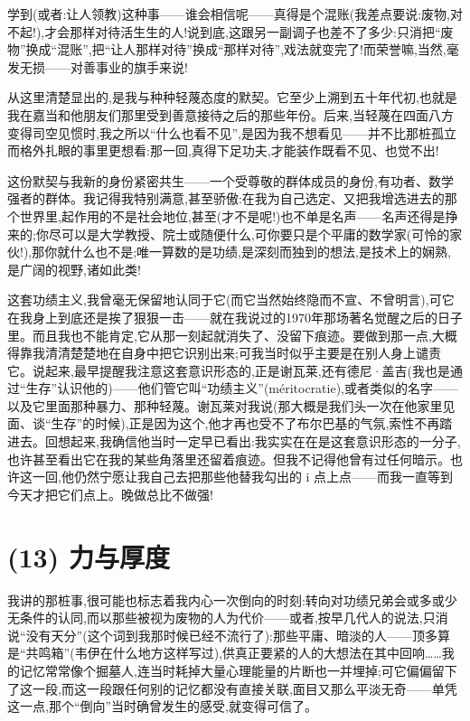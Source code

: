 学到(或者:让人领教)这种事——谁会相信呢——真得是个混账(我差点要说:废物,对不起!),才会那样对待活生生的人!说到底,这跟另一副调子也差不了多少:只消把“废物”换成“混账”,把“让人那样对待”换成“那样对待”,戏法就变完了!而荣誉嘛,当然,毫发无损——对善事业的旗手来说!

 从这里清楚显出的,是我与种种轻蔑态度的默契。它至少上溯到五十年代初,也就是我在嘉当和他朋友们那里受到善意接待之后的那些年份。后来,当轻蔑在四面八方变得司空见惯时,我之所以“什么也看不见”,是因为我不想看见——并不比那桩孤立而格外扎眼的事里更想看:那一回,真得下足功夫,才能装作既看不见、也觉不出!

这份默契与我新的身份紧密共生——一个受尊敬的群体成员的身份,有功者、数学强者的群体。我记得我特别满意,甚至骄傲:在我为自己选定、又把我增选进去的那个世界里,起作用的不是社会地位,甚至(才不是呢!)也不单是名声——名声还得是挣来的;你尽可以是大学教授、院士或随便什么,可你要只是个平庸的数学家(可怜的家伙!),那你就什么也不是;唯一算数的是功绩,是深刻而独到的想法,是技术上的娴熟,是广阔的视野,诸如此类!

这套功绩主义,我曾毫无保留地认同于它(而它当然始终隐而不宣、不曾明言),可它在我身上到底还是挨了狠狠一击——就在我说过的1970年那场著名觉醒之后的日子里。而且我也不能肯定,它从那一刻起就消失了、没留下痕迹。要做到那一点,大概得靠我清清楚楚地在自身中把它识别出来;可我当时似乎主要是在别人身上谴责它。说起来,最早提醒我注意这套意识形态的,正是谢瓦莱,还有德尼·盖吉(我也是通过“生存”认识他的)——他们管它叫“功绩主义”(méritocratie),或者类似的名字——以及它里面那种暴力、那种轻蔑。谢瓦莱对我说(那大概是我们头一次在他家里见面、谈“生存”的时候),正是因为这个,他才再也受不了布尔巴基的气氛,索性不再踏进去。回想起来,我确信他当时一定早已看出:我实实在在是这套意识形态的一分子,也许甚至看出它在我的某些角落里还留着痕迹。但我不记得他曾有过任何暗示。也许这一回,他仍然宁愿让我自己去把那些他替我勾出的 i 点上点——而我一直等到今天才把它们点上。晚做总比不做强!

\section{(13) 力与厚度}

 我讲的那桩事,很可能也标志着我内心一次倒向的时刻:转向对功绩兄弟会或多或少无条件的认同,而以那些被视为废物的人为代价——或者,按早几代人的说法,只消说“没有天分”(这个词到我那时候已经不流行了):那些平庸、暗淡的人——顶多算是“共鸣箱”(韦伊在什么地方这样写过),供真正要紧的人的大想法在其中回响……我的记忆常常像个掘墓人,连当时耗掉大量心理能量的片断也一并埋掉;可它偏偏留下了这一段,而这一段跟任何别的记忆都没有直接关联,面目又那么平淡无奇——单凭这一点,那个“倒向”当时确曾发生的感受,就变得可信了。

